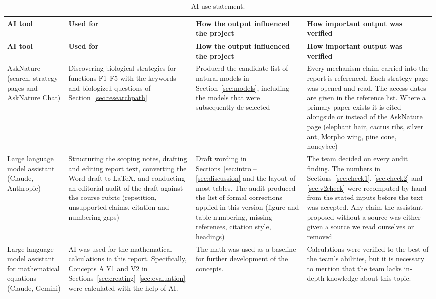 {\footnotesize
\renewcommand{\arraystretch}{1.1}
\setlength{\tabcolsep}{4pt}
\begin{longtable}{L{2.5cm} L{3.5cm} L{3.9cm} L{4.6cm}}
\caption{AI use statement.}\label{tab:aiuse}\\
\toprule
\textbf{AI tool} & \textbf{Used for} & \textbf{How the output influenced the project} & \textbf{How important output was verified} \\
\midrule
\endfirsthead
\toprule
\textbf{AI tool} & \textbf{Used for} & \textbf{How the output influenced the project} & \textbf{How important output was verified} \\
\midrule
\endhead
\bottomrule
\endfoot

AskNature (search, strategy pages and AskNature Chat) &
Discovering biological strategies for functions F1--F5 with the keywords and biologized
questions of Section~\ref{sec:researchpath} &
Produced the candidate list of natural models in Section~\ref{sec:models}, including the
models that were subsequently de-selected &
Every mechanism claim carried into the report is referenced. Each strategy page was
opened and read. The access dates are given in the reference list. Where a primary paper
exists it is cited alongside or instead of the AskNature page (elephant hair, cactus
ribs, silver ant, Morpho wing, pine cone, honeybee) \\

Large language model assistant (Claude, Anthropic) &
Structuring the scoping notes, drafting and editing report text, converting the Word
draft to \LaTeX, and conducting an editorial audit of the draft against the course rubric (repetition,
unsupported claims, citation and numbering gaps) &
Draft wording in Sections~\ref{sec:intro}--\ref{sec:discussion} and the layout of most
tables. The audit produced the list of formal corrections applied in this version
(figure and table numbering, missing references, citation style, headings) &
The team decided on every audit finding. The numbers in Sections~\ref{sec:check1},
\ref{sec:check2} and \ref{sec:v2check} were recomputed by hand from the stated inputs
before the text was accepted. Any claim the assistant proposed without a source was
either given a source we read ourselves or removed \\

Large language model assistant for mathematical equations (Claude, Gemini) &
AI was used for the mathematical calculations in this report.
Specifically, Concepts A V1 and V2 in Sections~\ref{sec:creating}--\ref{sec:evaluation} were calculated with the help of AI. &
The math was used as a baseline for further development of the concepts. &
Calculations were verified to the best of the team's abilities, but it is necessary to mention that the team lacks in-depth knowledge about this topic. \\


\end{longtable}}
